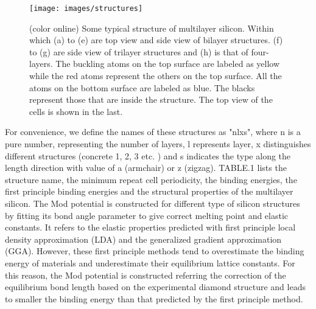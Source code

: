 \documentclass[%
 reprint,
 amsmath,amssymb,
 aps,
 prb,
]{revtex4-1}
\begin{document}
\begin{figure}[b]
\texttt{[image: images/structures]}
\caption{\label{fig:structures}  (color online) Some typical structure of multilayer silicon. Within which (a) to (e) are top view and side view of bilayer structures. (f) to (g) are side view of trilayer structures and (h) is that of four-layers. The buckling atoms on the top surface are labeled as yellow while the red atoms represent the others on the top surface. All the atoms on the bottom surface are labeled as blue. The blacks represent those that are inside the structure. The top view of the cells is shown in the last.}
\end{figure}

 For convenience, we define the names of these structures as "nlxs", where n is a pure number, representing the number of layers, l represents layer, x distinguishes different structures (concrete 1, 2, 3 etc. ) and s indicates the type along the length direction with value of a (armchair) or z (zigzag). TABLE.1 lists the structure name, the minimum repeat cell periodicity, the binding energies, the first principle binding energies and the structural properties of the multilayer silicon. The Mod potential is constructed for different type of silicon structures by fitting its bond angle parameter to give correct melting point and elastic constants. It refers to the elastic properties predicted with first principle local density approximation (LDA) and the generalized gradient approximation (GGA). However, these first principle methods tend to overestimate the binding energy of materials and underestimate their equilibrium lattice constants. For this reason, the Mod potential is constructed referring the correction of the equilibrium bond length based on the experimental diamond structure and leads to smaller the binding energy than that predicted by the first principle method.
\end{document}

